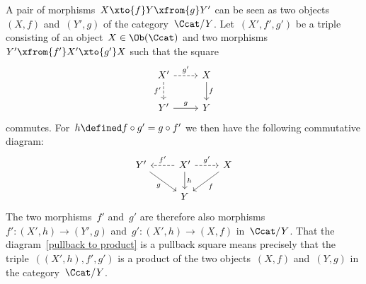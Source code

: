 \begin{remark*}
  A pair of morphisms~$X \xto{f} Y \xfrom{g} Y'$ can be seen as two objects~$(X,f)$ and~$(Y',g)$ of the category~$\Ccat/Y$.
  Let~$(X', f', g')$ be a triple consisting of an object~$X \in \Ob(\Ccat)$ and two morphisms~$Y' \xfrom{f'} X' \xto{g'} X$ such that the square
  \begin{equation}
    \label{pullback to product}
    \begin{tikzcd}
        X'
        \arrow[dashed]{r}[above]{g'}
        \arrow[dashed]{d}[left]{f'}
      & X
        \arrow{d}[right]{f}
      \\
        Y'
        \arrow{r}[above]{g}
      & Y
    \end{tikzcd}
  \end{equation}
  commutes.
  For~$h \defined f \circ g' = g \circ f'$ we then have the following commutative diagram:
  \[
    \begin{tikzcd}
        Y'
        \arrow{dr}[below left]{g}
      & X'
        \arrow[dashed]{l}[above]{f'}
        \arrow{d}[right]{h}
        \arrow[dashed]{r}[above]{g'}
      & X
        \arrow{dl}[below right]{f}
      \\
        {}
      & Y
      & {}
    \end{tikzcd}
  \]
  The two morphisms~$f'$ and~$g'$ are therefore also morphisms~$f' \colon (X',h) \to (Y',g)$ and~$g' \colon (X',h) \to (X,f)$ in~$\Ccat/Y$.
  That the diagram~\eqref{pullback to product} is a pullback square means precisely that the triple~$((X',h), f', g')$ is a product of the two objects~$(X,f)$ and~$(Y,g)$ in the category~$\Ccat/Y$.
\end{remark*}


